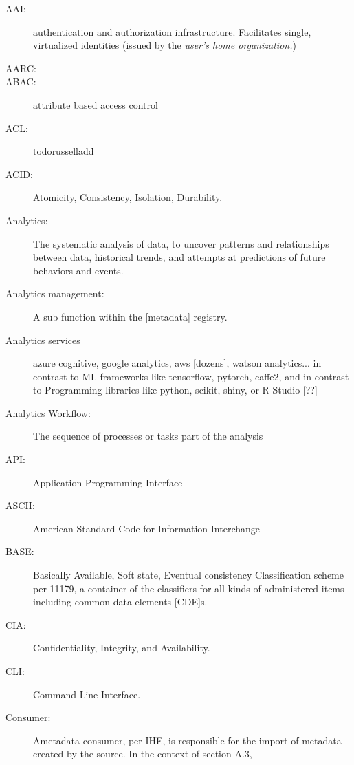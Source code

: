 
\begin{description}

\item[AAI:]	authentication and authorization infrastructure. Facilitates single, virtualized identities (issued by the {\em user’s home organization.}) 

\item[AARC:]     
\item[ABAC:]   attribute based access control
\item[ACL:]    todo{russell}{add} 

\item[ACID:]	Atomicity, Consistency, Isolation, Durability.

\item[Analytics:]	The systematic analysis of data, to uncover patterns and relationships between data, historical trends, and attempts at predictions of future behaviors and events.  

\item[Analytics management:]	A sub function within the [metadata] registry.

\item[Analytics services]	azure cognitive, google analytics, aws [dozens], watson analytics... in contrast to ML frameworks like tensorflow, pytorch, caffe2, and in contrast to Programming libraries like python, scikit, shiny, or R Studio [??] 


\item[Analytics Workflow:]	The sequence of processes or tasks part of the analysis

\item[API:]	Application Programming Interface

\item[ASCII:]	American Standard Code for Information Interchange

\item[BASE:]	Basically Available, Soft state, Eventual consistency
Classification scheme	per 11179, a container of the classifiers for all kinds of administered items including common data elements [CDE]s. 

\item[CIA:]	   Confidentiality, Integrity, and Availability.

\item[CLI:]	   Command Line Interface.

\item[Consumer:] Ametadata consumer, per IHE, is responsible for the import of metadata created 			by the source. In the context of section A.3, 


\end{description}
